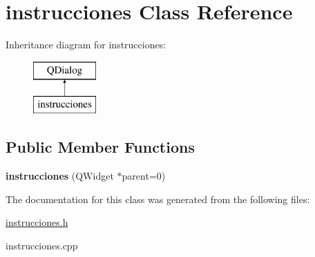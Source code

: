 \hypertarget{classinstrucciones}{\section{instrucciones Class Reference}
\label{classinstrucciones}
}
Inheritance diagram for instrucciones\-:\begin{figure}[H]
\begin{center}
\leavevmode
\includegraphics[height=2.000000cm]{classinstrucciones}
\end{center}
\end{figure}
\subsection*{Public Member Functions}
\begin{DoxyCompactItemize}
\item 
\hypertarget{classinstrucciones_a22121db0527da6bbee041cd85c0662dc}{{\bfseries instrucciones} (Q\-Widget $\ast$parent=0)}\label{classinstrucciones_a22121db0527da6bbee041cd85c0662dc}

\end{DoxyCompactItemize}


The documentation for this class was generated from the following files\-:\begin{DoxyCompactItemize}
\item 
\hyperlink{instrucciones_8h}{instrucciones.\-h}\item 
instrucciones.\-cpp\end{DoxyCompactItemize}
